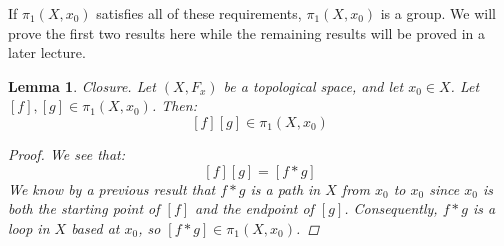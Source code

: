 \documentclass[reqno]{amsart}
\newtheorem{lemma}[theorem]{Lemma}
\begin{document}
If $\pi_1(X,x_0)$ satisfies all of these requirements, $\pi_1(X,x_0)$ is a group.
We will prove the first two results here while the remaining results will be proved in a later lecture.

\begin{lemma} Closure. Let $(X,F_x)$ be a topological space, and let $x_0\in X$. Let $[f],[g]\in \pi_1(X,x_0)$. Then:
\[[f][g] \in \pi_1(X,x_0)\]

\begin{proof}
We see that:
\[[f][g] = [f*g]\]
We know by a previous result that $f*g$ is a path in $X$ from $x_0$ to $x_0$ since $x_0$ is both the starting point of $[f]$ and the endpoint of $[g]$. Consequently, $f*g$ is a loop in $X$ based at $x_0$, so $[f*g] \in \pi_1(X,x_0)$. 
\end{proof}
\end{lemma}
\end{document}
